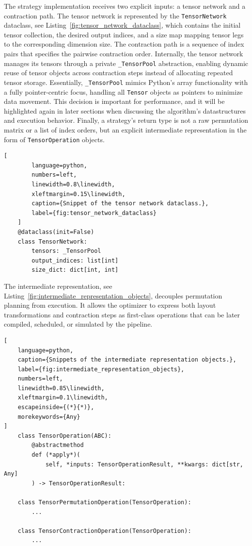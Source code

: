 The strategy implementation receives two explicit inputs: a tensor network and a contraction path. The tensor network is represented by the \texttt{TensorNetwork} dataclass, see Listing~\ref{fig:tensor_network_dataclass}, which contains the initial tensor collection, the desired output indices, and a size map mapping tensor legs to the corresponding dimension size. The contraction path is a sequence of index pairs that specifies the pairwise contraction order. Internally, the tensor network manages its tensors through a private \texttt{\_TensorPool} abstraction, enabling dynamic reuse of tensor objects across contraction steps instead of allocating repeated tensor storage. Essentially, \texttt{\_TensorPool} mimics Python's array functionality with a fully pointer-centric focus, handling all \texttt{Tensor} objects as pointers to minimize data movement. This decision is important for performance, and it will be highlighted again in later sections when discussing the algorithm's datastructures and execution behavior. Finally, a strategy's return type is not a raw permutation matrix or a list of index orders, but an explicit intermediate representation in the form of \texttt{TensorOperation} objects.


\begin{center}
    \begin{lstlisting}[
        language=python,    
        numbers=left,
        linewidth=0.8\linewidth,
        xleftmargin=0.15\linewidth,
        caption={Snippet of the tensor network dataclass.},
        label={fig:tensor_network_dataclass}
    ]
    @dataclass(init=False)
    class TensorNetwork:
        tensors: _TensorPool
        output_indices: list[int]
        size_dict: dict[int, int]
    \end{lstlisting}
\end{center}

The intermediate representation, see Listing~\ref{fig:intermediate_representation_objects}, decouples permutation planning from execution. It allows the optimizer to express both layout transformations and contraction steps as first-class operations that can be later compiled, scheduled, or simulated by the pipeline.

\begin{center}
\begin{lstlisting}[
    language=python,
    caption={Snippets of the intermediate representation objects.},
    label={fig:intermediate_representation_objects},
    numbers=left,
    linewidth=0.85\linewidth,
    xleftmargin=0.1\linewidth,
    escapeinside={(*}{*)},
    morekeywords={Any}
]
    class TensorOperation(ABC):
        @abstractmethod
        def (*apply*)(
            self, *inputs: TensorOperationResult, **kwargs: dict[str, Any]
        ) -> TensorOperationResult:

    class TensorPermutationOperation(TensorOperation):
        ...

    class TensorContractionOperation(TensorOperation):
        ...
\end{lstlisting}
\end{center}



